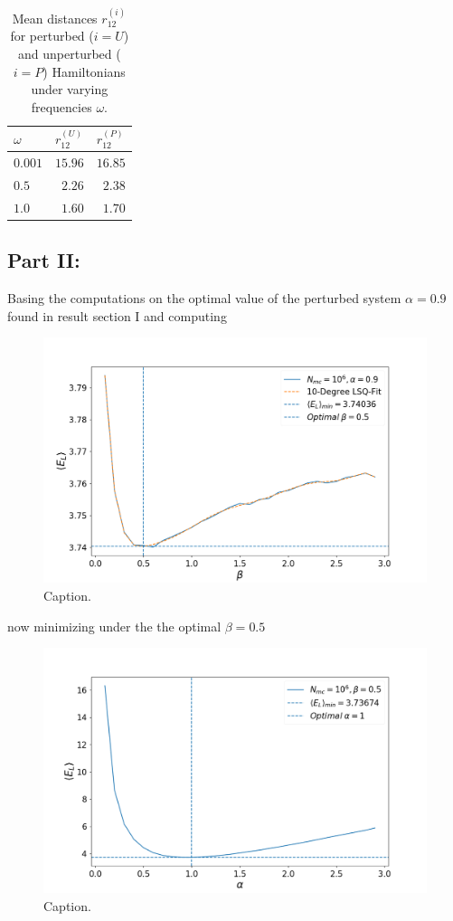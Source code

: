 \documentclass[aip,nobalancelastpage,
twocolumn,
rsi,%
 amsmath,amssymb,
 reprint,%
]{revtex4}
\begin{document}
\begin{table}[H]
\center
\caption{Mean distances $r_{12}^{(i)}$ for perturbed ($i=U$) and unperturbed ($i=P$) Hamiltonians under varying frequencies $\omega$.}
\begin{tabular}{| p{2cm} | p{2cm} | p{2cm} |}
\hline
$\omega$ & $r_{12}^{(U)}$ & $r_{12}^{(P)}$\\
\hline
$0.001$ & $15.96$ & $16.85$\\
\hline
$0.5$   & $\phantom{1}2.26$  & $\phantom{1}2.38$\\
\hline
$1.0$   & $\phantom{1}1.60$  & $\phantom{1}1.70$\\
\hline
\end{tabular}
\label{TablePartI}
\end{table}


\subsection{Part II: }
Basing the computations on the optimal value of the perturbed system $\alpha=0.9$ found in result section I and computing 

\begin{figure}[H]
\center
\includegraphics[scale=0.30]{figsPartII/run1.png}
\caption{Caption.}
\label{IIfig1}
\end{figure}

now minimizing under the the optimal $\beta = 0.5$

\begin{figure}[H]
\center
\includegraphics[scale=0.30]{figsPartII/run2.png}
\caption{Caption.}
\label{IIfig2}
\end{figure}
\end{document}
